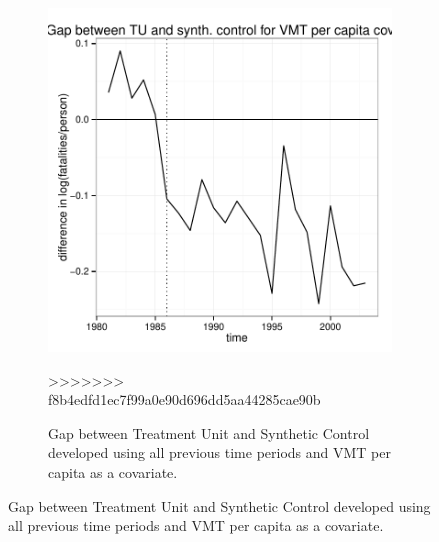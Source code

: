 \documentclass[letterpaper, 12pt]{article}
\begin{document}
\begin{figure}
\begin{centering}
\begin{figure}[htbp]
\begin{center}
\includegraphics{img-gap-vmt.pdf}
\caption{Gap between Treatment Unit and Synthetic Control developed using all previous time periods and VMT per capita as a covariate.}
\label{fig:c13}
\end{center}
>>>>>>> f8b4edfd1ec7f99a0e90d696dd5aa44285cae90b
\end{figure}


\end{centering}
\end{figure}
\end{document}
